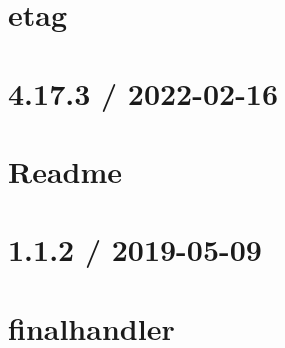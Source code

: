 \documentclass[twoside]{book}
\newcommand{\+}{\discretionary{\mbox{\scriptsize$\hookleftarrow$}}{}{}}
\begin{document}
\chapter{etag}
\label{md__c___users_vaishnavi_jadhav__desktop__developer_code_mean_stack_example_server_node_modules_etag__r_e_a_d_m_e}

\chapter{4.17.3 / 2022-\/02-\/16}
\label{md__c___users_vaishnavi_jadhav__desktop__developer_code_mean_stack_example_server_node_modules_express__history}

\chapter{Readme}
\label{md__c___users_vaishnavi_jadhav__desktop__developer_code_mean_stack_example_server_node_modules_express__readme}

\chapter{1.1.2 / 2019-\/05-\/09}
\label{md__c___users_vaishnavi_jadhav__desktop__developer_code_mean_stack_example_server_node_modules_finalhandler__h_i_s_t_o_r_y}

\chapter{finalhandler}
\label{md__c___users_vaishnavi_jadhav__desktop__developer_code_mean_stack_example_server_node_modules_finalhandler__r_e_a_d_m_e}

\end{document}
